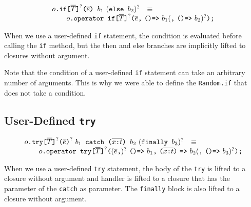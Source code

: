 $$
\begin{array}{rcl}
  \usrIf{o}{\overline{T}}{\overline{e}}{b_1}{b_2}
  & \equiv &
  \\
  \multicolumn{3}{r}{
  \qquad  \libIf{o}{\overline{T}}{\overline{e}}{b_1}{b_2}
  }
\end{array}
$$

  When we use a user-defined \verb+if+ statement, the condition is
evaluated before calling the \verb+if+ method, but the then and else
branches are implicitly lifted to closures without argument.

Note that the condition of a user-defined \verb+if+ statement can take
an arbitrary number of arguments. This is why we were able to define the
\verb+Random.if+ that does not take a condition.


\subsection{User-Defined \texttt{try}}

$$
\begin{array}{rcl}
  \usrTry{o}{\overline{T}}{\overline{e}}{b_1}{\overline{\vardecl{x}{t}}}{b_2}{b_3}
  & \equiv &
  \\
\multicolumn{3}{r}{
 \qquad \libTry{o}{\overline{T}}{\overline{e}}{b_1}{\overline{\vardecl{x}{t}}}{b_2}{b_3}
}
\end{array}
$$

When we use a user-defined \verb+try+ statement, the body of the
\verb+try+ is lifted to a closure without argument and handler is
lifted to a closure that has the parameter of the \verb+catch+ as
parameter. The \verb+finally+ block is also lifted to a closure
without argument.


